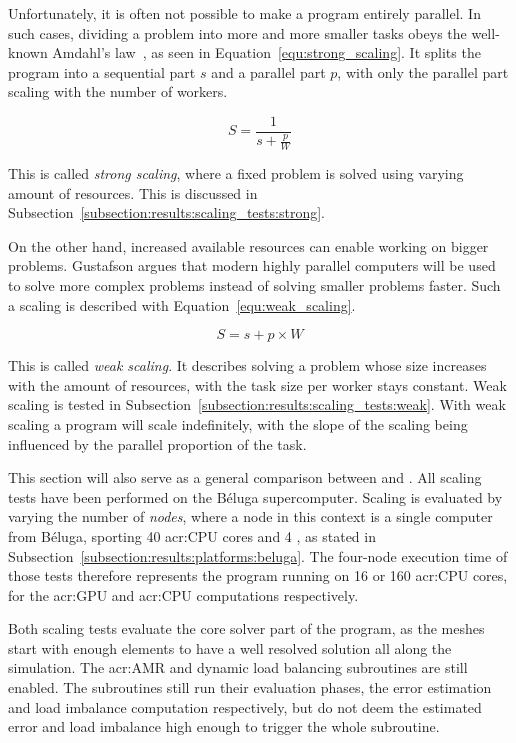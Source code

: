 Unfortunately, it is often not possible to make a program entirely parallel. In such cases, dividing
a problem into more and more smaller tasks obeys the well-known Amdahl's law~\cite{Amdahl1967}, as
seen in Equation~\ref{equ:strong_scaling}. It splits the program into a sequential part \(s\) and a
parallel part \(p\), with only the parallel part scaling with the number of workers.

\begin{equation} \label{equ:strong_scaling}
	S = \frac{1}{s + \frac{p}{W}}
\end{equation}

This is called \textit{strong scaling}, where a fixed problem is solved using varying amount of
resources. This is discussed in Subsection~\ref{subsection:results:scaling_tests:strong}.

On the other hand, increased available resources can enable working on bigger problems. Gustafson
argues that modern highly parallel computers will be used to solve more complex problems instead of
solving smaller problems faster. Such a scaling is described with Equation~\ref{equ:weak_scaling}.

\begin{equation} \label{equ:weak_scaling}
	S = s + p \times W
\end{equation}

This is called \textit{weak scaling}. It describes solving a problem whose size increases with the
amount of resources, with the task size per worker stays constant. Weak scaling is tested in
Subsection~\ref{subsection:results:scaling_tests:weak}. With weak scaling a program will scale
indefinitely, with the slope of the scaling being influenced by the parallel proportion of the task.

This section will also serve as a general comparison between  and
. All scaling tests have been performed on the Béluga supercomputer. Scaling is
evaluated by varying the number of \textit{nodes}, where a node in this context is a single computer
from Béluga, sporting 40 \acrshort{acr:CPU} cores and 4 , as stated in
Subsection~\ref{subsection:results:platforms:beluga}. The four-node execution time of those tests
therefore represents the program running on 16  or 160 \acrshort{acr:CPU} cores,
for the \acrshort{acr:GPU} and \acrshort{acr:CPU} computations respectively.

Both scaling tests evaluate the core solver part of the program, as the meshes start with enough
elements to have a well resolved solution all along the simulation. The \acrlong{acr:AMR} and
dynamic load balancing subroutines are still enabled. The subroutines still run their evaluation
phases, the error estimation and load imbalance computation respectively, but do not deem the
estimated error and load imbalance high enough to trigger the whole subroutine. 

